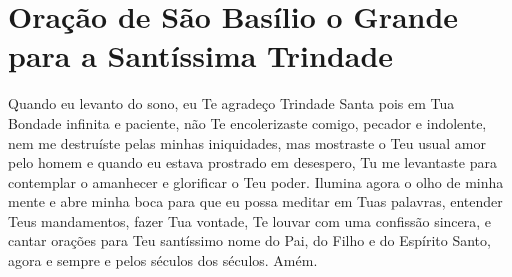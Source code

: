 \documentclass{subfiles}
\begin{document}
\mercy{} 


\section*{Oração de São Basílio o Grande para a Santíssima Trindade}

Quando eu levanto do sono, eu Te agradeço Trindade Santa pois em 
Tua Bondade infinita e paciente, não Te encolerizaste comigo, pecador e 
indolente, nem me destruíste pelas minhas iniquidades, mas mostraste o Teu 
usual amor pelo homem e quando eu estava prostrado em desespero, Tu me 
levantaste para contemplar o amanhecer e glorificar o Teu poder. Ilumina 
agora o olho de minha mente e abre minha boca para que eu possa meditar 
em Tuas palavras, entender Teus mandamentos, fazer Tua vontade, Te louvar 
com uma confissão sincera, e cantar orações para Teu santíssimo nome do Pai, 
do Filho e do Espírito Santo, agora e sempre e pelos séculos dos séculos. 
Amém. 

\end{document}
